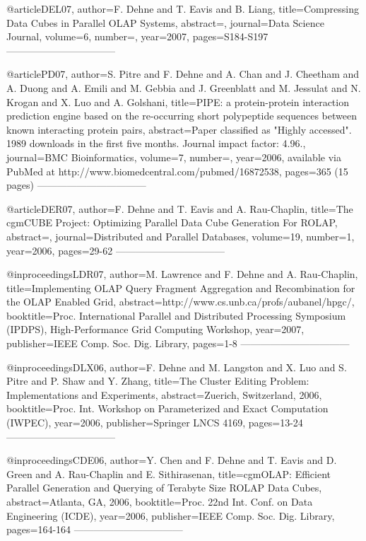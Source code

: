
@article{DEL07,
	author={F. Dehne and T. Eavis and B. Liang},
	title={Compressing Data Cubes in Parallel {OLAP} Systems},
	abstract={},
	journal={Data Science Journal},
	volume={6},
	number={},
	year={2007},
	pages={S184-S197}
} ---------------------------------
 
@article{PD07,
	author={S. Pitre and F. Dehne and A. Chan and J. Cheetham and A. Duong and A. Emili and M. Gebbia and J. Greenblatt and M. Jessulat and N. Krogan and X. Luo and A. Golshani},
	title={{PIPE}: a protein-protein interaction prediction engine based on the re-occurring short polypeptide sequences between known interacting protein pairs},
	abstract={Paper classified as "Highly accessed". 1989 downloads in the first five months. Journal impact factor: 4.96.},
	journal={BMC Bioinformatics},
	volume={7},
	number={},
	year={2006, available via PubMed at http://www.biomedcentral.com/pubmed/16872538},
	pages={365 (15 pages)}
} ---------------------------------

@article{DER07,
	author={F. Dehne and T. Eavis and A. Rau-Chaplin},
	title={The {cgmCUBE} Project: Optimizing Parallel Data Cube Generation For {ROLAP}},
	abstract={},
	journal={Distributed and Parallel Databases},
	volume={19},
	number={1},
	year={2006},
	pages={29-62}
} --------------------------------- 

@inproceedings{LDR07,
	author={M. Lawrence and F. Dehne and A. Rau-Chaplin},
	title={Implementing {OLAP} Query Fragment Aggregation and Recombination for the {OLAP} Enabled Grid},
	abstract={http://www.cs.unb.ca/profs/aubanel/hpgc/},
	booktitle={Proc. International Parallel and Distributed Processing Symposium (IPDPS), High-Performance Grid Computing Workshop},
	year={2007},
	publisher={IEEE Comp. Soc. Dig. Library},
	pages={1-8}
} ---------------------------------

@inproceedings{DLX06,
	author={F. Dehne and M. Langston and X. Luo and S. Pitre and P. Shaw and Y. Zhang},
	title={The Cluster Editing Problem: Implementations and Experiments},
	abstract={Zuerich, Switzerland, 2006},
	booktitle={Proc. Int. Workshop on Parameterized and Exact Computation (IWPEC)},
	year={2006},
	publisher={Springer LNCS 4169},
	pages={13-24}
} ---------------------------------


@inproceedings{CDE06,
	author={Y. Chen and F. Dehne and T. Eavis and D. Green and A. Rau-Chaplin and E. Sithirasenan},
	title={{cgmOLAP}: Efficient Parallel Generation and Querying of Terabyte Size {ROLAP} Data Cubes},
	abstract={Atlanta, GA, 2006},
	booktitle={Proc. 22nd Int. Conf. on Data Engineering (ICDE)},
	year={2006},
	publisher={IEEE Comp. Soc. Dig. Library},
	pages={164-164}
} ---------------------------------

